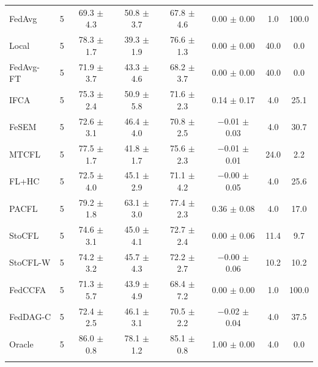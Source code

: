 {\begin{tabular}{l r c c c c c c}
FedAvg & 5 & 69.3 $\pm$ 4.3 & 50.8 $\pm$ 3.7 & 67.8 $\pm$ 4.6 & 0.00 $\pm$ 0.00 & 1.0 & 100.0 \\
Local & 5 & 78.3 $\pm$ 1.7 & 39.3 $\pm$ 1.9 & 76.6 $\pm$ 1.3 & 0.00 $\pm$ 0.00 & 40.0 & 0.0 \\
FedAvg-FT & 5 & 71.9 $\pm$ 3.7 & 43.3 $\pm$ 4.6 & 68.2 $\pm$ 3.7 & 0.00 $\pm$ 0.00 & 40.0 & 0.0 \\
IFCA & 5 & 75.3 $\pm$ 2.4 & 50.9 $\pm$ 5.8 & 71.6 $\pm$ 2.3 & 0.14 $\pm$ 0.17 & 4.0 & 25.1 \\
FeSEM & 5 & 72.6 $\pm$ 3.1 & 46.4 $\pm$ 4.0 & 70.8 $\pm$ 2.5 & $-$0.01 $\pm$ 0.03 & 4.0 & 30.7 \\
MTCFL & 5 & 77.5 $\pm$ 1.7 & 41.8 $\pm$ 1.7 & 75.6 $\pm$ 2.3 & $-$0.01 $\pm$ 0.01 & 24.0 & 2.2 \\
FL+HC & 5 & 72.5 $\pm$ 4.0 & 45.1 $\pm$ 2.9 & 71.1 $\pm$ 4.2 & $-$0.00 $\pm$ 0.05 & 4.0 & 25.6 \\
PACFL & 5 & 79.2 $\pm$ 1.8 & 63.1 $\pm$ 3.0 & 77.4 $\pm$ 2.3 & 0.36 $\pm$ 0.08 & 4.0 & 17.0 \\
StoCFL & 5 & 74.6 $\pm$ 3.1 & 45.0 $\pm$ 4.1 & 72.7 $\pm$ 2.4 & 0.00 $\pm$ 0.06 & 11.4 & 9.7 \\
StoCFL-W & 5 & 74.2 $\pm$ 3.2 & 45.7 $\pm$ 4.3 & 72.2 $\pm$ 2.7 & $-$0.00 $\pm$ 0.06 & 10.2 & 10.2 \\
FedCCFA & 5 & 71.3 $\pm$ 5.7 & 43.9 $\pm$ 4.9 & 68.4 $\pm$ 7.2 & 0.00 $\pm$ 0.00 & 1.0 & 100.0 \\
FedDAG-C & 5 & 72.4 $\pm$ 2.5 & 46.1 $\pm$ 3.1 & 70.5 $\pm$ 2.2 & $-$0.02 $\pm$ 0.04 & 4.0 & 37.5 \\
Oracle & 5 & 86.0 $\pm$ 0.8 & 78.1 $\pm$ 1.2 & 85.1 $\pm$ 0.8 & 1.00 $\pm$ 0.00 & 4.0 & 0.0 \\
\addlinespace
\bottomrule
\end{tabular}
}

